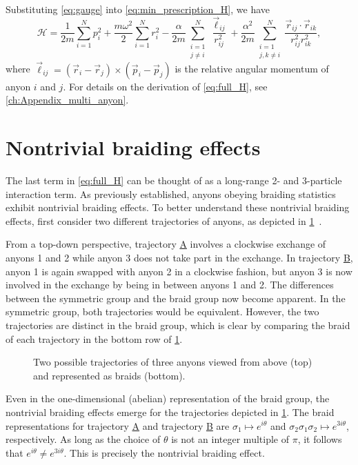 Substituting \cref{eq:gauge} into \cref{eq:min_prescription_H}, we have
\begin{equation}
    \mathcal{H} = \frac{1}{2m}\sum_{i=1}^{N}{p}_i^{2} + \frac{m\omega^2}{2}\sum_{i=1}^{N}{r}_i^{2} - \frac{\alpha}{2m}\sum_{\substack{i=1\\j\neq i}}^{N}\frac{\vec{\ell}_{ij}}{r_{ij}^2} + \frac{\alpha^2}{2m}\sum_{\substack{i=1\\j,k\neq i}}^{N}\frac{\vec{r}_{ij}\cdot\vec{r}_{ik}}{r_{ij}^2r_{ik}^2},\label{eq:full_H}
\end{equation}
where $\vec{\ell}_{ij} = (\vec{r}_i-\vec{r}_j)\times(\vec{p}_i-\vec{p}_j)$ is the relative angular momentum of anyon $i$ and $j$. For details on the derivation of \cref{eq:full_H}, see \cref{ch:Appendix_multi_anyon}.

\section{Nontrivial braiding effects}

The last term in \cref{eq:full_H} can be thought of as a long-range 2- and 3-particle interaction term. As previously established, anyons obeying braiding statistics exhibit nontrivial braiding effects. To better understand these nontrivial braiding effects, first consider two different trajectories of anyons, as depicted in \cref{fig:anyon_trajectores}~\cite{Khare2005}. 

From a top-down perspective, trajectory \hyperref[traj:A]{A} involves a clockwise exchange of anyons 1 and 2 while anyon 3 does not take part in the exchange. In trajectory \hyperref[traj:B]{B}, anyon 1 is again swapped with anyon 2 in a clockwise fashion, but anyon 3 is now involved in the exchange by being in between anyons 1 and 2. The differences between the symmetric group and the braid group now become apparent. In the symmetric group, both trajectories would be equivalent. However, the two trajectories are distinct in the braid group, which is clear by comparing the braid of each trajectory in the bottom row of \cref{fig:anyon_trajectores}.

\begin{figure}[htbp]
    \centering
    
    \caption[Anyon trajectories]{Two possible trajectories of three anyons viewed from above (top) and represented as braids (bottom).}\label{fig:anyon_trajectores}
\end{figure}

Even in the one-dimensional (abelian) representation of the braid group, the nontrivial braiding effects emerge for the trajectories depicted in \cref{fig:anyon_trajectores}. The braid representations for trajectory \hyperref[traj:A]{A} and trajectory \hyperref[traj:B]{B} are $\sigma_1\mapsto e^{i\theta}$ and $\sigma_2\sigma_1\sigma_2\mapsto e^{3i\theta}$, respectively. As long as the choice of $\theta$ is not an integer multiple of $\pi$, it follows that $e^{i\theta}\neq e^{3i\theta}$. This is precisely the nontrivial braiding effect.

